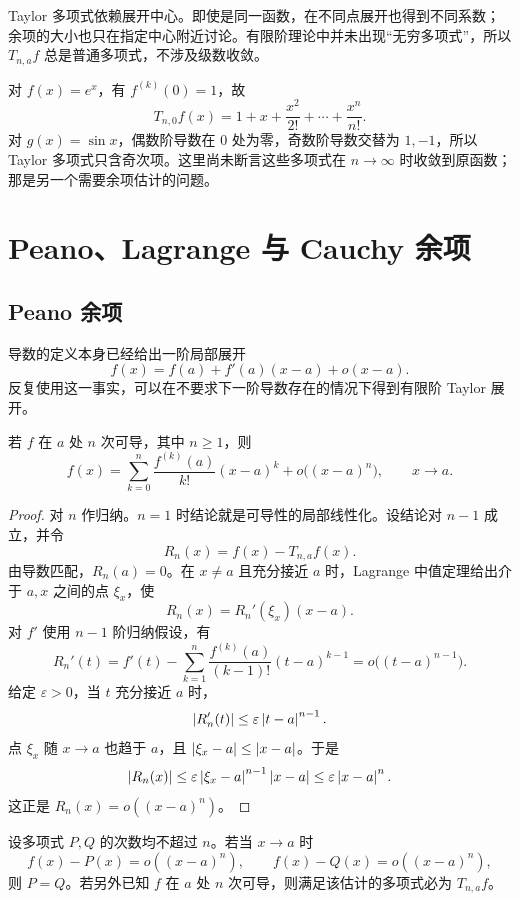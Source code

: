 Taylor 多项式依赖展开中心。即使是同一函数，在不同点展开也得到不同系数；余项的大小也只在指定中心附近讨论。有限阶理论中并未出现“无穷多项式”，所以 \(T_{n,a}f\) 总是普通多项式，不涉及级数收敛。

\begin{example}
对 \(f(x)=e^x\)，有 \(f^{(k)}(0)=1\)，故
\[
 T_{n,0}f(x)=1+x+\frac{x^2}{2!}+\cdots+\frac{x^n}{n!}.
\]
对 \(g(x)=\sin x\)，偶数阶导数在 \(0\) 处为零，奇数阶导数交替为 \(1,-1\)，所以 Taylor 多项式只含奇次项。这里尚未断言这些多项式在 \(n\to\infty\) 时收敛到原函数；那是另一个需要余项估计的问题。
\end{example}

\section{Peano、Lagrange 与 Cauchy 余项}

\subsection{Peano 余项}

导数的定义本身已经给出一阶局部展开
\[
 f(x)=f(a)+f'(a)(x-a)+o(x-a).
\]
反复使用这一事实，可以在不要求下一阶导数存在的情况下得到有限阶 Taylor 展开。

\begin{theorem}
\label{thm:taylor-peano}
若 \(f\) 在 \(a\) 处 \(n\) 次可导，其中 \(n\ge1\)，则
\[
 f(x)=\sum_{k=0}^{n}\frac{f^{(k)}(a)}{k!}(x-a)^k
      +o\bigl((x-a)^n\bigr),
 \qquad x\to a.
\]
\end{theorem}

\begin{proof}
对 \(n\) 作归纳。\(n=1\) 时结论就是可导性的局部线性化。设结论对 \(n-1\) 成立，并令
\[
 R_n(x)=f(x)-T_{n,a}f(x).
\]
由导数匹配，\(R_n(a)=0\)。在 \(x\ne a\) 且充分接近 \(a\) 时，Lagrange 中值定理给出介于 \(a,x\) 之间的点 \(\xi_x\)，使
\[
 R_n(x)=R_n'(\xi_x)(x-a).
\]
对 \(f'\) 使用 \(n-1\) 阶归纳假设，有
\[
 R_n'(t)
 =f'(t)-\sum_{k=1}^{n}\frac{f^{(k)}(a)}{(k-1)!}(t-a)^{k-1}
 =o\bigl((t-a)^{n-1}\bigr).
\]
给定 \(\varepsilon>0\)，当 \(t\) 充分接近 \(a\) 时，
\[
 \left|R_n'(t)\right|\le\varepsilon\left|t-a\right|^{n-1}.
\]
点 \(\xi_x\) 随 \(x\to a\) 也趋于 \(a\)，且
\(\left|\xi_x-a\right|\le\left|x-a\right|\)。于是
\[
 \left|R_n(x)\right|
 \le\varepsilon\left|\xi_x-a\right|^{n-1}\left|x-a\right|
 \le\varepsilon\left|x-a\right|^{n}.
\]
这正是 \(R_n(x)=o((x-a)^n)\)。
\end{proof}

\begin{proposition}[渐近多项式的唯一性]
\label{prop:asymptotic-polynomial-uniqueness}
设多项式 \(P,Q\) 的次数均不超过 \(n\)。若当 \(x\to a\) 时
\[
 f(x)-P(x)=o((x-a)^n),\qquad
 f(x)-Q(x)=o((x-a)^n),
\]
则 \(P=Q\)。若另外已知 \(f\) 在 \(a\) 处 \(n\) 次可导，则满足该估计的多项式必为 \(T_{n,a}f\)。
\end{proposition}

